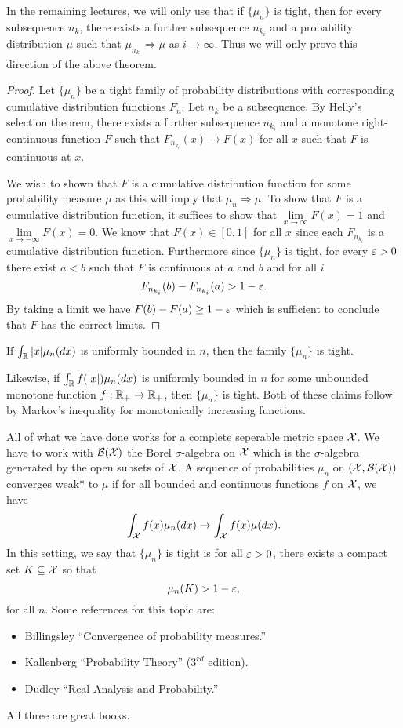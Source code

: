 In the remaining lectures, we will only use that if $\{\mu_n\}$ is tight, then for every subsequence $n_k$, there exists a further subsequence $n_{k_i}$ and a probability distribution $\mu$ such that $\mu_{n_{k_i}} \Rightarrow \mu$ as $i \to \infty$. Thus we will only prove this direction of the above theorem.
\begin{proof}
    Let $\{\mu_n\}$ be a tight family of probability distributions with corresponding cumulative distribution functions $F_{n}$. Let $n_k$ be a subsequence. By Helly's selection theorem, there exists a further subsequence $n_{k_i}$ and a monotone right-continuous function $F$ such that $F_{n_{k_i}}(x) \to F(x)$ for all $x$ such that $F$ is continuous at $x$. 
    
    We wish to shown that $F$ is a cumulative distribution function for some probability measure $\mu$ as this will imply that $\mu_n \Rightarrow \mu$. To show that $F$ is a cumulative distribution function, it suffices to show that $\lim\limits_{x \to \infty}F(x)=1$ and $\lim\limits_{x \to - \infty}F(x)=0$. We know that $F(x) \in [0,1]$ for all $x$ since each $F_{n_{k_i}}$ is a cumulative distribution function. Furthermore since $\{\mu_n\}$ is tight, for every $\varepsilon>0$ there exist $a<b$ such that $F$ is continuous at $a$ and $b$ and for all $i$
    \[F_{n_{k_i}}(b)-F_{n_{k_i}}(a) > 1-\varepsilon.\]
    By  taking a limit we have $F(b)-F(a) \ge 1-\varepsilon$ which is sufficient to conclude that $F$ has the correct limits.
\end{proof}
\begin{remark}
    If $\int_{\mathbb R} {\left\lvert x\right\rvert}\mu_n(dx)$ is uniformly bounded in $n$, then the family $\{\mu_n\}$ is tight.
    
    Likewise, if $\int_{\mathbb R} f({\left\lvert x\right\rvert})\mu_n(dx)$ is uniformly bounded in $n$ for some unbounded monotone function $f:{\mathbb R}_+ \to {\mathbb R}_+$, then $\{\mu_n\}$ is tight. Both of these claims follow by Markov's inequality for monotonically increasing functions.
\end{remark}
\begin{remark}
    All of what we have done works for a complete seperable metric space ${\mathcal{X}}$. We have to work with ${\mathcal{B}}({\mathcal{X}})$ the Borel $\sigma$-algebra on ${\mathcal{X}}$ which is the $\sigma$-algebra generated by the open subsets of ${\mathcal{X}}$. A sequence of probabilities $\mu_n$ on $({\mathcal{X}},{\mathcal{B}}({\mathcal{X}}))$ converges weak* to $\mu$ if for all bounded and continuous functions $f$ on ${\mathcal{X}}$, we have 
    \[\int_{\mathcal{X}} f(x)\mu_n(dx)\to \int_{\mathcal{X}} f(x)\mu(dx). \]
    In this setting, we say that $\{\mu_n\}$ is tight is for all $\varepsilon > 0$, there exists a compact set $K \subseteq {\mathcal{X}}$ so that 
    \[\mu_n(K) > 1-\varepsilon,\]
    for all $n$. Some references for this topic are:
    \begin{itemize}
        \item Billingsley ``Convergence of probability measures.''
        \item Kallenberg ``Probability Theory'' ($3^{rd}$ edition).
        \item Dudley ``Real Analysis and Probability.''
    \end{itemize}
    All three are great books.
\end{remark}

